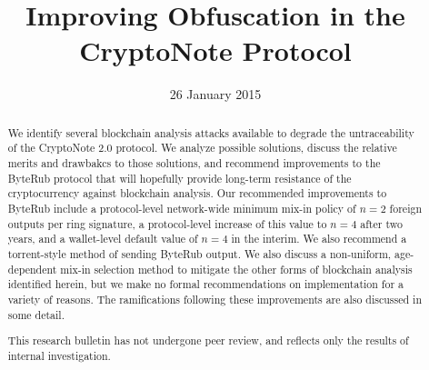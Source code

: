 \documentclass[12pt,english]{mrl}
\theoremstyle{definition}
\numberwithin{equation}{section}
\numberwithin{figure}{section}
\numberwithin{equation}{section}
\numberwithin{equation}{section}
\numberwithin{figure}{section}
\begin{document}
\begin{frontmatter}

\begin{fmbox}
\hfill\setlength{\fboxrule}{0px}\setlength{\fboxsep}{5px}
\title{Improving Obfuscation in the CryptoNote Protocol}
\date{26 January 2015}
\author[
   addressref={mrl},
   email={lab@getbyterub.org}
]{ }
\author[
   addressref={mrl},
   email={lab@getbyterub.org}
]{ }
\author[
   addressref={mrl},
   email={lab@getbyterub.org}
]{}


\address[id=mrl]{
}
\end{fmbox}


\begin{abstractbox}
\begin{abstract}
We identify several blockchain analysis attacks available to degrade the untraceability of the CryptoNote 2.0 protocol. We analyze possible solutions, discuss the relative merits and drawbakcs to those solutions, and recommend improvements to the ByteRub protocol that will hopefully provide long-term resistance of the cryptocurrency against blockchain analysis. Our recommended improvements to ByteRub include a protocol-level network-wide minimum mix-in policy of $n=2$ foreign outputs per ring signature, a protocol-level increase of this value to $n=4$ after two years, and a wallet-level default value of $n=4$ in the interim. We also recommend a torrent-style method of sending ByteRub output. We also discuss a non-uniform, age-dependent mix-in selection method to mitigate the other forms of blockchain analysis identified herein, but we make no formal recommendations on implementation for a variety of reasons.  The ramifications following these improvements are also discussed in some detail.

This research bulletin has not undergone peer review, and reflects only the results of internal investigation.
\end{abstract}
\end{abstractbox}

\end{frontmatter}

\end{document}

